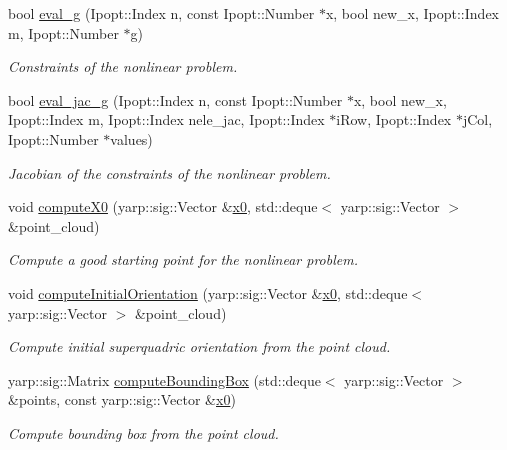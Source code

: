 \begin{DoxyCompactItemize}
bool \mbox{\hyperlink{classSuperQuadric__NLP_a43a2c0f905b6e38045bcb55a93ae8654}{eval\+\_\+g}} (Ipopt\+::\+Index n, const Ipopt\+::\+Number $\ast$x, bool new\+\_\+x, Ipopt\+::\+Index m, Ipopt\+::\+Number $\ast$g)
\begin{DoxyCompactList}\small\item\em Constraints of the nonlinear problem. \end{DoxyCompactList}\item 
bool \mbox{\hyperlink{classSuperQuadric__NLP_a2eac4aa901938d0637769c66d68aeec2}{eval\+\_\+jac\+\_\+g}} (Ipopt\+::\+Index n, const Ipopt\+::\+Number $\ast$x, bool new\+\_\+x, Ipopt\+::\+Index m, Ipopt\+::\+Index nele\+\_\+jac, Ipopt\+::\+Index $\ast$i\+Row, Ipopt\+::\+Index $\ast$j\+Col, Ipopt\+::\+Number $\ast$values)
\begin{DoxyCompactList}\small\item\em Jacobian of the constraints of the nonlinear problem. \end{DoxyCompactList}\item 
void \mbox{\hyperlink{classSuperQuadric__NLP_a7395729e42b83d083b88451620ede9c6}{compute\+X0}} (yarp\+::sig\+::\+Vector \&\mbox{\hyperlink{classSuperQuadric__NLP_a25e5121f404d68a8fa0122e803945f8b}{x0}}, std\+::deque$<$ yarp\+::sig\+::\+Vector $>$ \&point\+\_\+cloud)
\begin{DoxyCompactList}\small\item\em Compute a good starting point for the nonlinear problem. \end{DoxyCompactList}\item 
void \mbox{\hyperlink{classSuperQuadric__NLP_a6fd9bdffb81bfdfec56bae2efd58c270}{compute\+Initial\+Orientation}} (yarp\+::sig\+::\+Vector \&\mbox{\hyperlink{classSuperQuadric__NLP_a25e5121f404d68a8fa0122e803945f8b}{x0}}, std\+::deque$<$ yarp\+::sig\+::\+Vector $>$ \&point\+\_\+cloud)
\begin{DoxyCompactList}\small\item\em Compute initial superquadric orientation from the point cloud. \end{DoxyCompactList}\item 
yarp\+::sig\+::\+Matrix \mbox{\hyperlink{classSuperQuadric__NLP_a425745a725c4f0dba398a6b5389809a7}{compute\+Bounding\+Box}} (std\+::deque$<$ yarp\+::sig\+::\+Vector $>$ \&points, const yarp\+::sig\+::\+Vector \&\mbox{\hyperlink{classSuperQuadric__NLP_a25e5121f404d68a8fa0122e803945f8b}{x0}})
\begin{DoxyCompactList}\small\item\em Compute bounding box from the point cloud. \end{DoxyCompactList}\item 

\end{DoxyCompactItemize}
